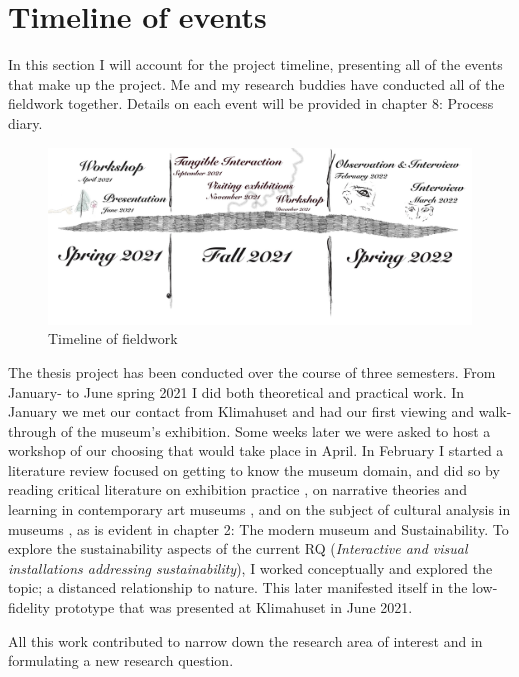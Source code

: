 \section{Timeline of events}
In this section I will account for the project timeline, presenting all of the events that make up the project. Me and my research buddies have conducted all of the fieldwork together. Details on each event will be provided in chapter 8: Process diary.

\begin{figure}[H]
\includegraphics[width=14cm]{pictures/methodology/timeline.jpg}
\caption{Timeline of fieldwork}
\centering 
\end{figure}

The thesis project has been conducted over the course of three semesters. From January- to June spring 2021 I did both theoretical and practical work. In January we met our contact from Klimahuset and had our first viewing and walk-through of the museum's exhibition. Some weeks later we were asked to host a workshop of our choosing that would take place in April. In February I started a literature review focused on getting to know the museum domain, and did so by reading critical literature on exhibition practice \autocite{Thi_book}, on narrative theories and learning in contemporary art museums \autocite{narrative_sitzia}, and on the subject of cultural analysis in museums \autocite{Miekebal_book}, as is evident in chapter 2: The modern museum and Sustainability. To explore the sustainability aspects of the current RQ (\emph{Interactive and visual installations addressing sustainability}), I worked conceptually and explored the topic; a distanced relationship to nature. This later manifested itself in the low-fidelity prototype that was presented at Klimahuset in June 2021. 

All this work contributed to narrow down the research area of interest and in formulating a new research question. 


